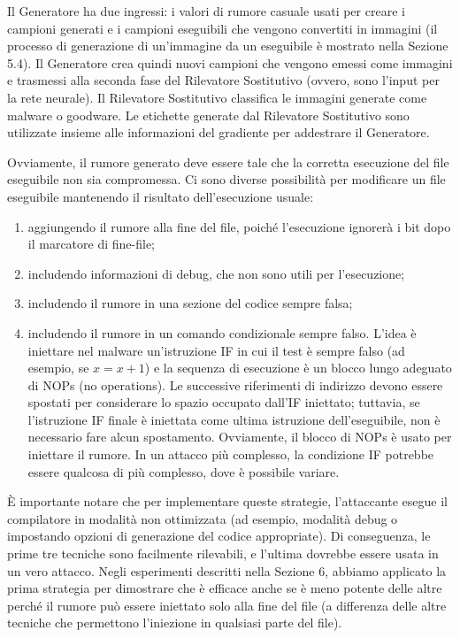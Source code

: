 Il Generatore ha due ingressi: i valori di rumore casuale usati per creare i campioni generati e i campioni eseguibili che vengono convertiti in immagini (il processo di generazione di un'immagine da un eseguibile è mostrato nella Sezione 5.4). Il Generatore crea quindi nuovi campioni che vengono emessi come immagini e trasmessi alla seconda fase del Rilevatore Sostitutivo (ovvero, sono l'input per la rete neurale). Il Rilevatore Sostitutivo classifica le immagini generate come malware o goodware. Le etichette generate dal Rilevatore Sostitutivo sono utilizzate insieme alle informazioni del gradiente per addestrare il Generatore.

Ovviamente, il rumore generato deve essere tale che la corretta esecuzione del file eseguibile non sia compromessa. Ci sono diverse possibilità per modificare un file eseguibile mantenendo il risultato dell'esecuzione usuale:

\begin{enumerate}
  \item aggiungendo il rumore alla fine del file, poiché l'esecuzione ignorerà i bit dopo il marcatore di fine-file;
  \item includendo informazioni di debug, che non sono utili per l'esecuzione;
  \item includendo il rumore in una sezione del codice sempre falsa;
  \item includendo il rumore in un comando condizionale sempre falso. L'idea è iniettare nel malware un'istruzione IF in cui il test è sempre falso (ad esempio, se \( x = x + 1 \)) e la sequenza di esecuzione è un blocco lungo adeguato di NOPs (no operations). Le successive riferimenti di indirizzo devono essere spostati per considerare lo spazio occupato dall'IF iniettato; tuttavia, se l'istruzione IF finale è iniettata come ultima istruzione dell'eseguibile, non è necessario fare alcun spostamento. Ovviamente, il blocco di NOPs è usato per iniettare il rumore. In un attacco più complesso, la condizione IF potrebbe essere qualcosa di più complesso, dove è possibile variare.
\end{enumerate}

È importante notare che per implementare queste strategie, l'attaccante esegue il compilatore in modalità non ottimizzata (ad esempio, modalità debug o impostando opzioni di generazione del codice appropriate). Di conseguenza, le prime tre tecniche sono facilmente rilevabili, e l'ultima dovrebbe essere usata in un vero attacco. Negli esperimenti descritti nella Sezione 6, abbiamo applicato la prima strategia per dimostrare che è efficace anche se è meno potente delle altre perché il rumore può essere iniettato solo alla fine del file (a differenza delle altre tecniche che permettono l'iniezione in qualsiasi parte del file).

